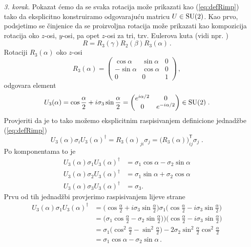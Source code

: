 \emph{3. korak.} 
Pokazat ćemo da se svaka rotacija može prikazati kao (\ref{eq:defRimp}) 
tako da eksplicitno konstruiramo odgovarajuću matricu $U \in \mathrm{SU}(2)$.
Kao prvo, podsjetimo se činjenice da se proizvoljna rotacija može prikazati
kao kompozicija rotacija oko $z$-osi, $y$-osi, pa opet $z$-osi za tri,
tzv. Eulerova kuta (vidi npr. \cite{Sakurai:2011}) 
\begin{equation}
R = R_{3}(\gamma) R_{2}(\beta) R_{3}(\alpha) \,.
\end{equation}
Rotaciji $R_{3}(\alpha)$  oko $z$-osi
\begin{equation}
   R_{3}(\alpha) = 
   \begin{pmatrix}
       \cos\alpha & \sin\alpha & 0 \\
      -\sin\alpha & \cos\alpha & 0 \\
       0 & 0 & 1
   \end{pmatrix} \,,
\end{equation}
odgovara element
\begin{equation}
    U_{3}(\alpha) =   \cos\frac{\alpha}{2} + i \sigma_{3} \sin\frac{\alpha}{2} =
    \begin{pmatrix}
        e^{i\alpha/2} & 0 \\
        0 & e^{-i\alpha/2}
    \end{pmatrix} \in \mathrm{SU}(2) \;.
\end{equation}
Provjeriti da je to tako možemo eksplicitnim raspisivanjem definicione
jednadžbe (\ref{eq:defRimp}) 
\begin{equation}
    U_{3}(\alpha) \sigma_i U_{3}(\alpha)^\dagger =
    R_{3}(\alpha)_{ji} \sigma_{j} = \big(R_{3}(\alpha)\big)^{\mathsf{T}}_{ij} \sigma_j \;.
\end{equation}
Po komponentama to je
\begin{align}
    U_{3}(\alpha) \sigma_1 U_{3}(\alpha)^\dagger& = \sigma_1 \cos\alpha - \sigma_2 \sin\alpha \\
    U_{3}(\alpha) \sigma_2 U_{3}(\alpha)^\dagger& = \sigma_1 \sin\alpha + \sigma_2 \cos\alpha \\
    U_{3}(\alpha) \sigma_3 U_{3}(\alpha)^\dagger& = \sigma_3
.\end{align}
Prvu od tih jednadžbi provjerimo raspisivanjem lijeve strane
\begin{align}
    U_{3}(\alpha) \sigma_1 U_{3}(\alpha)^\dagger & =
    \big(\cos\frac{\alpha}{2} + i \sigma_{3} \sin\frac{\alpha}{2}\big) \sigma_1
    \big(\cos\frac{\alpha}{2} - i \sigma_{3} \sin\frac{\alpha}{2}\big) \\
& =   \big(\sigma_1 \cos\frac{\alpha}{2} - \sigma_{2} \sin\frac{\alpha}{2})\big)
    \big(\cos\frac{\alpha}{2} - i \sigma_{3} \sin\frac{\alpha}{2}\big) \\
& =   \sigma_1 \big(\cos^{2}\frac{\alpha}{2} -  \sin^{2}\frac{\alpha}{2}\big)
  -   2 \sigma_2 \sin^{2}\frac{\alpha}{2}\cos^{2}\frac{\alpha}{2} \\
& =   \sigma_1 \cos\alpha -  \sigma_2 \sin\alpha \,.
\end{align}
